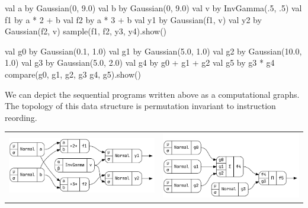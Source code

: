\documentclass[landscape,a0b,final,a4resizeable]{a0poster}
\newenvironment{poster}{
\begin{center}
\begin{minipage}[c]{0.96\textwidth}
}{
\end{minipage}
\end{center}
}
\theoremstyle{definition}
\theoremstyle{remark}
\begin{document}
\begin{poster}
\begin{multicols}{3}
\null\hspace*{0.5cm}\begin{minipage}[c]{0.50\columnwidth}
\centering
\begin{kotlinlisting}
val a  by Gaussian(0, 9.0)
val b  by Gaussian(0, 9.0)
val v  by InvGamma(.5, .5)
val f1 by a * 2 + b
val f2 by a * 3 + b
val y1 by Gaussian(f1, v)
val y2 by Gaussian(f2, v)
sample(f1, f2, y3, y4).show()
\end{kotlinlisting}
\end{minipage}
\null\hspace*{1cm}\begin{minipage}[c]{0.50\columnwidth}
\begin{kotlinlisting}
val g0 by Gaussian(0.1,  1.0)
val g1 by Gaussian(5.0,  1.0)
val g2 by Gaussian(10.0, 1.0)
val g3 by Gaussian(5.0,  2.0)
val g4 by g0 + g1 + g2
val g5 by g3 * g4
compare(g0, g1, g2, g3
        g4, g5).show()
\end{kotlinlisting}
\end{minipage}

\vspace{\baselineskip}

We can depict the sequential programs written above as a computational graphs. The topology of this data structure is permutation invariant to instruction reording.

\vspace{\baselineskip}

\begin{tabular}{cc}
\begin{minipage}[c]{0.5\columnwidth}
\centering
\includegraphics[width=\columnwidth]{bayesLR.png}
\end{minipage}
&
\begin{minipage}[c]{0.5\columnwidth}
\centering
\includegraphics[width=\columnwidth]{bayesR.png}
\end{minipage}
\end{tabular}


\end{multicols}
\end{poster}
\end{document}
